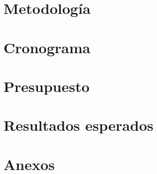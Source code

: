 \documentclass[12pt]{MIA-USA}
\begin{document}
    \chapter{Metodolog\'ia}
    
    
    \chapter{Cronograma}
    
    
    \chapter{Presupuesto}
    
    
    \chapter{Resultados esperados}
    
    
    \chapter*{Anexos}
    
    
    
    
 	
\end{document}
